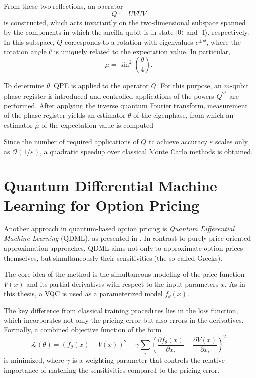 From these two reflections, an operator
\begin{equation}
    Q := U V U V
\end{equation}
is constructed, which acts invariantly on the two-dimensional subspace spanned by the components in which the ancilla qubit is in state $|0\rangle$ and $|1\rangle$, respectively. In this subspace, $Q$ corresponds to a rotation with eigenvalues $e^{\pm i\theta}$, where the rotation angle $\theta$ is uniquely related to the expectation value. In particular,
\begin{equation}
    \mu = \sin^2\!\left(\frac{\theta}{4}\right).
\end{equation}

To determine $\theta$, QPE is applied to the operator $Q$. For this purpose, an $m$-qubit phase register is introduced and controlled applications of the powers $Q^{2^k}$ are performed. After applying the inverse quantum Fourier transform, measurement of the phase register yields an estimator $\tilde\theta$ of the eigenphase, from which an estimator $\hat\mu$ of the expectation value is computed.

Since the number of required applications of $Q$ to achieve accuracy $\varepsilon$ scales only as $\mathcal O(1/\varepsilon)$, a quadratic speedup over classical Monte Carlo methods is obtained.

\section{Quantum Differential Machine Learning for Option Pricing}

Another approach in quantum-based option pricing is \emph{Quantum Differential Machine Learning} (QDML), as presented in \cite{sakuma2025quantum}. In contrast to purely price-oriented approximation approaches, QDML aims not only to approximate option prices themselves, but simultaneously their sensitivities (the so-called Greeks).

The core idea of the method is the simultaneous modeling of the price function \( V(x) \) and its partial derivatives with respect to the input parameters \( x \). As in this thesis, a VQC is used as a parameterized model \( f_\theta(x) \).

The key difference from classical training procedures lies in the loss function, which incorporates not only the pricing error but also errors in the derivatives. Formally, a combined objective function of the form
\begin{equation}
\mathcal{L}(\theta)
=
(f_\theta(x)-V(x))^2
+
\gamma
\sum_i
\left(
\frac{\partial f_\theta(x)}{\partial x_i}
-
\frac{\partial V(x)}{\partial x_i}
\right)^2
\end{equation}
is minimized, where \( \gamma \) is a weighting parameter that controls the relative importance of matching the sensitivities compared to the pricing error.

